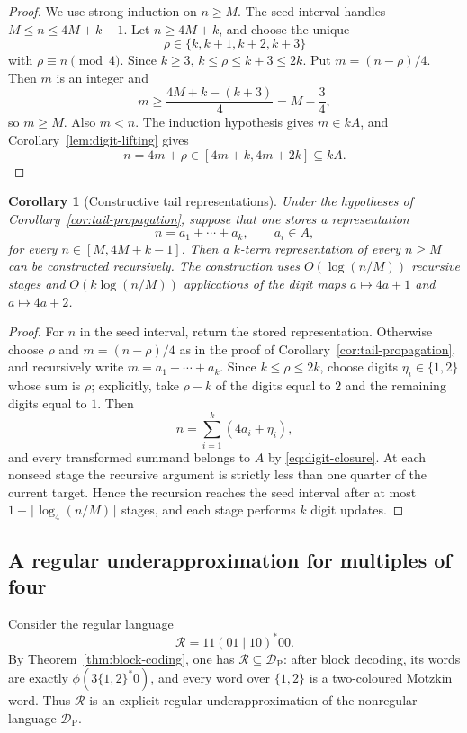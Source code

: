 \documentclass[11pt]{article}
\theoremstyle{plain}
\newtheorem{corollary}[theorem]{Corollary}
\theoremstyle{definition}
\newcommand{\DP}{\mathcal{D}_{\mathrm{P}}}
\begin{document}
\begin{proof}
We use strong induction on $n\geq M$.  The seed interval handles
$M\leq n\leq4M+k-1$.  Let $n\geq4M+k$, and choose the unique
\[
 \rho\in\{k,k+1,k+2,k+3\}
\]
with $\rho\equiv n\pmod4$.  Since $k\geq3$,
$k\leq\rho\leq k+3\leq2k$.  Put $m=(n-\rho)/4$.  Then $m$ is an
integer and
\[
 m\geq\frac{4M+k-(k+3)}4=M-\frac34,
\]
so $m\geq M$.  Also $m<n$.  The induction hypothesis gives $m\in kA$,
and Corollary~\ref{lem:digit-lifting} gives
\[
 n=4m+\rho\in[4m+k,4m+2k]\subseteq kA.
\]
\end{proof}

\begin{corollary}[Constructive tail representations]
\label{cor:constructive-tail}
Under the hypotheses of Corollary~\ref{cor:tail-propagation}, suppose that
one stores a representation
\[
 n=a_1+\cdots+a_k,\qquad a_i\in A,
\]
for every $n\in[M,4M+k-1]$.  Then a $k$-term representation of every
$n\geq M$ can be constructed recursively.  The construction uses
$O(\log(n/M))$ recursive stages and $O(k\log(n/M))$ applications of the
digit maps $a\mapsto4a+1$ and $a\mapsto4a+2$.
\end{corollary}

\begin{proof}
For $n$ in the seed interval, return the stored representation.  Otherwise
choose $\rho$ and $m=(n-\rho)/4$ as in the proof of
Corollary~\ref{cor:tail-propagation}, and recursively write
$m=a_1+\cdots+a_k$.  Since $k\leq\rho\leq2k$, choose digits
$\eta_i\in\{1,2\}$ whose sum is $\rho$; explicitly, take
$\rho-k$ of the digits equal to $2$ and the remaining digits equal to $1$.
Then
\[
 n=\sum_{i=1}^k(4a_i+\eta_i),
\]
and every transformed summand belongs to $A$ by
\eqref{eq:digit-closure}.  At each nonseed stage the recursive argument is
strictly less than one quarter of the current target.  Hence the recursion
reaches the seed interval after at most
$1+\lceil\log_4(n/M)\rceil$ stages, and each stage performs $k$ digit
updates.
\end{proof}
\subsection{A regular underapproximation for multiples of four}

Consider the regular language
\[
 \mathcal R=11(01\mid10)^*00.
\]
By Theorem~\ref{thm:block-coding}, one has
$\mathcal R\subseteq\DP$: after block decoding, its words are exactly
$\phi(3\{1,2\}^*0)$, and every word over $\{1,2\}$ is a two-coloured
Motzkin word.  Thus $\mathcal R$ is an explicit regular
underapproximation of the nonregular language $\DP$.
\end{document}
